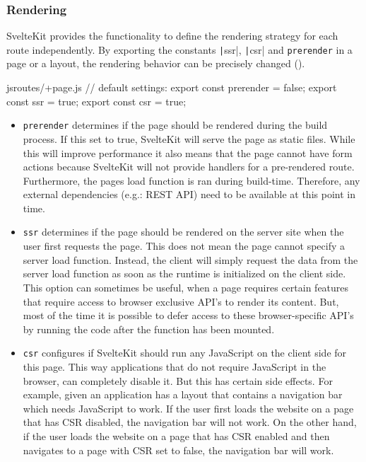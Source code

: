 \subsubsection{Rendering}

SvelteKit provides the functionality to define the rendering strategy for each route independently. By exporting the constants \texttt|ssr|, \texttt|csr| and \texttt{prerender} in a page or a layout, the rendering behavior can be precisely changed ().

\begin{listing}[h!]
\begin{myminted}{js}{routes/+page.js}
// default settings:
export const prerender = false;
export const ssr = true;
export const csr = true;
\end{myminted}
\caption{Variables that can be exported to configure the rendering behavior of a page in SvelteKit.}
\label{fig:sveltekit-rendering-config}
\end{listing}

\begin{itemize}
    \item \texttt{prerender} determines if the page should be rendered during the build process. If this set to true, SvelteKit will serve the page as static files. While this will improve performance it also means that the page cannot have form actions because SvelteKit will not provide handlers for a pre-rendered route. Furthermore, the pages load function is ran during build-time. Therefore, any external dependencies (e.g.: REST API) need to be available at this point in time.
    
    \item \texttt{ssr} determines if the page should be rendered on the server site when the user first requests the page. This does not mean the page cannot specify a server load function. Instead, the client will simply request the data from the server load function as soon as the runtime is initialized on the client side. This option can sometimes be useful, when a page requires certain features that require access to browser exclusive API's to render its content. But, most of the time it is possible to defer access to these browser-specific API's by running the code after the function has been mounted.

    \item \texttt{csr} configures if SvelteKit should run any JavaScript on the client side for this page. This way applications that do not require JavaScript in the browser, can completely disable it. But this has certain side effects. For example, given an application has a layout that contains a navigation bar which needs JavaScript to work. If the user first loads the website on a page that has CSR disabled, the navigation bar will not work. On the other hand, if the user loads the website on a page that has CSR enabled and then navigates to a page with CSR set to false, the navigation bar will work.
\end{itemize}